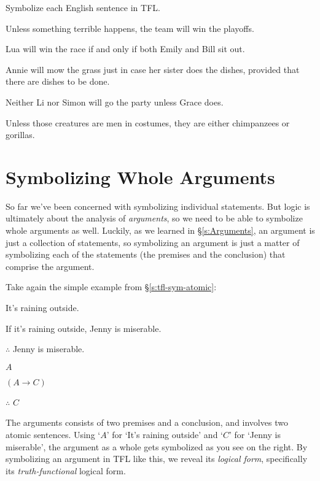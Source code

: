 \practiceproblems
\problempart Symbolize each English sentence in TFL.

\begin{earg}
\item Unless something terrible happens, the team will win the playoffs.
\item Lua will win the race if and only if both Emily and Bill sit out.
\item Annie will mow the grass just in case her sister does the dishes, provided that there are dishes to be done.
\item Neither Li nor Simon will go the party unless Grace does.
\item Unless those creatures are men in costumes, they are either chimpanzees or gorillas.

\end{earg}



\section{Symbolizing Whole Arguments}

So far we've been concerned with symbolizing individual statements.  But logic is ultimately about the analysis of \emph{arguments}, so we need to be able to symbolize  whole arguments as well.  Luckily, as we learned in \S\ref{s:Arguments}, an argument is just a collection of statements, so symbolizing an argument is just a matter of symbolizing each of the statements (the premises and the conclusion) that comprise the argument.

Take again the simple example from \S\ref{s:tfl-sym-atomic}:
\begin{multicols}{2}
	\begin{earg}
		\item[\eref{exarg1}] It's raining outside.
		\item[] If it's raining outside, Jenny is miserable.
		\item[] $\therefore$ Jenny is miserable.
	\end{earg}
\columnbreak
	\begin{earg}
		\item[] $A$
		\item[] $(A \rightarrow C)$
		\item[] $\therefore$ $C$
	\end{earg}
\end{multicols}
\noindent The arguments consists of two premises and a conclusion, and involves two atomic sentences.  Using `$A$' for `It's raining outside' and `$C$' for `Jenny is miserable', the argument as a whole gets symbolized as you see on the right.  By symbolizing an argument in TFL like this, we reveal its \emph{logical form}, specifically its \emph{truth-functional} logical form.

